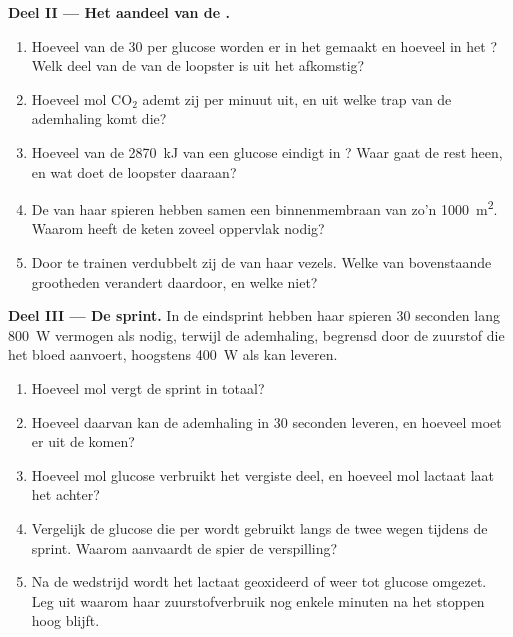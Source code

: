 \begin{problem}
\medskip
\noindent\textbf{Deel II --- Het aandeel van de .}
\begin{enumerate}[resume]
  \item Hoeveel van de 30  per glucose worden er in het 
        gemaakt en hoeveel in het ? Welk deel van de  van
        de loopster is uit het  afkomstig?
  \item Hoeveel mol $\mathrm{CO_2}$ ademt zij per minuut uit, en uit welke
        trap van de ademhaling komt die?
  \item Hoeveel van de \qty{2870}{kJ} van een glucose eindigt in ? Waar
        gaat de rest heen, en wat doet de loopster daaraan?
  \item De  van haar spieren hebben samen een binnenmembraan
        van zo'n \qty{1000}{m^2}. Waarom heeft de keten zoveel oppervlak
        nodig?
  \item Door te trainen verdubbelt zij de  van haar vezels.
        Welke van bovenstaande grootheden verandert daardoor, en welke
        niet?
\end{enumerate}

\medskip
\noindent\textbf{Deel III --- De sprint.}
In de eindsprint hebben haar spieren 30 seconden lang \qty{800}{W}
vermogen als  nodig, terwijl de ademhaling, begrensd door de zuurstof
die het bloed aanvoert, hoogstens \qty{400}{W} als  kan leveren.
\begin{enumerate}[resume]
  \item Hoeveel mol  vergt de sprint in totaal?
  \item Hoeveel daarvan kan de ademhaling in 30 seconden leveren, en
        hoeveel moet er uit de  komen?
  \item Hoeveel mol glucose verbruikt het vergiste deel, en hoeveel mol
        lactaat laat het achter?
  \item Vergelijk de glucose die per  wordt gebruikt langs de twee
        wegen tijdens de sprint. Waarom aanvaardt de spier de
        verspilling?
  \item Na de wedstrijd wordt het lactaat geoxideerd of weer tot glucose
        omgezet. Leg uit waarom haar zuurstofverbruik nog enkele minuten
        na het stoppen hoog blijft.
\end{enumerate}


\end{problem}
